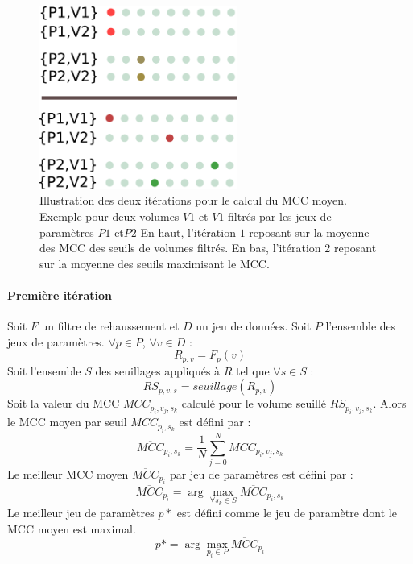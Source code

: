   \begin{figure}[H]
    \centering
    \includegraphics[height=6cm]{Images/optim.png}
    \caption{Illustration des deux itérations pour le calcul du MCC moyen. Exemple pour deux volumes $V1$ et $V1$ filtrés par les jeux de paramètres $P1$ et$P2$ En haut, l'itération $1$ reposant sur la moyenne des MCC des seuils de volumes filtrés. En bas, l'itération 2 reposant sur la moyenne des seuils maximisant le MCC.}
    \label{fig:illustration_opti}
  \end{figure}    

  \paragraph{Première itération}

  Soit $F$ un filtre de rehaussement et $D$ un jeu de données. Soit $P$ l'ensemble des jeux de paramètres. 
  $\forall p \in P$, $\forall v \in D$ :
  \begin{equation}
    R_{p,v} = F_{p}(v)
  \end{equation}
  Soit l'ensemble $S$ des seuillages appliqués à $R$ tel que $\forall s \in S$ :
  \begin{equation}
    RS_{p,v,s} = seuillage(R_{p,v}) 
  \end{equation}
  Soit la valeur du MCC $MCC_{p_i,v_j,s_k}$ calculé pour le volume seuillé $RS_{p_i,v_j,s_k}$.
  Alors le MCC moyen par seuil $\overline{MCC}_{p_i,s_k}$ est défini par :
  \begin{equation}
    \overline{MCC}_{p_i,s_k} = \frac{1}{N}\sum_{j=0}^{N} MCC_{p_i,v_j,s_k}
  \end{equation}
  Le meilleur MCC moyen $\overline{MCC}_{p_i}$ par jeu de paramètres est défini par : 
  \begin{equation}
    \overline{MCC}_{p_i} = \arg\max_{\forall s_k \in S} \overline{MCC}_{p_i,s_k}
  \end{equation}
  Le meilleur jeu de paramètres $p*$ est défini comme le jeu de paramètre dont le MCC moyen est maximal.
  \begin{equation}
    p* = \arg\max_{p_i \in P} \overline{MCC}_{p_i}
  \end{equation}

